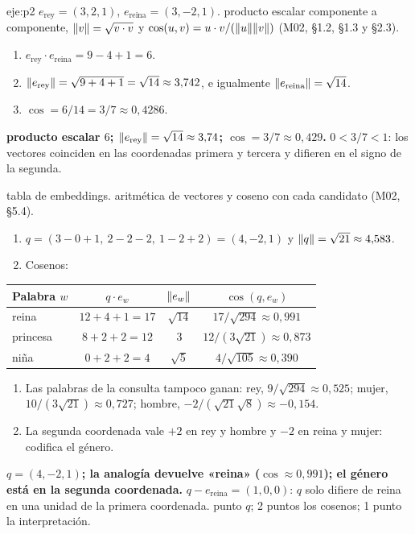 \begin{solucion}{eje:p2}
\datos $e_{\text{rey}}=(3,2,1)$, $e_{\text{reina}}=(3,-2,1)$.
\planteamiento producto escalar componente a componente, $\lVert v\rVert=\sqrt{v\cdot v}$ y $\cos(u,v)=u\cdot v/(\lVert u\rVert\lVert v\rVert)$ (M02, §1.2, §1.3 y §2.3).
\pasos
\begin{enumerate}[label=\arabic*.]
  \item $e_{\text{rey}}\cdot e_{\text{reina}}=9-4+1=6$.
  \item $\lVert e_{\text{rey}}\rVert=\sqrt{9+4+1}=\sqrt{14}\approx 3{,}742$, e igualmente $\lVert e_{\text{reina}}\rVert=\sqrt{14}$.
  \item $\cos=6/14=3/7\approx 0{,}4286$.
\end{enumerate}
\resultado \textbf{producto escalar $6$; $\lVert e_{\text{rey}}\rVert=\sqrt{14}\approx 3{,}74$; $\cos=3/7\approx 0{,}429$.}
\comprobacion $0<3/7<1$: los vectores coinciden en las coordenadas primera y tercera y difieren en el signo de la segunda.

\datos tabla de embeddings.
\planteamiento aritmética de vectores y coseno con cada candidato (M02, §5.4).
\pasos
\begin{enumerate}[label=\arabic*.]
  \item $q=(3-0+1,\ 2-2-2,\ 1-2+2)=(4,-2,1)$ y $\lVert q\rVert=\sqrt{21}\approx 4{,}583$.
  \item Cosenos:
\end{enumerate}
\begin{center}
\small
\begin{tabular}{@{}lccc@{}}
\toprule
Palabra $w$ & $q\cdot e_w$ & $\lVert e_w\rVert$ & $\cos(q,e_w)$ \\
\midrule
reina & $12+4+1=17$ & $\sqrt{14}$ & $17/\sqrt{294}\approx 0{,}991$ \\
princesa & $8+2+2=12$ & $3$ & $12/(3\sqrt{21})\approx 0{,}873$ \\
niña & $0+2+2=4$ & $\sqrt5$ & $4/\sqrt{105}\approx 0{,}390$ \\
\bottomrule
\end{tabular}
\end{center}
\begin{enumerate}[label=\arabic*.,start=3]
  \item Las palabras de la consulta tampoco ganan: rey, $9/\sqrt{294}\approx 0{,}525$; mujer, $10/(3\sqrt{21})\approx 0{,}727$; hombre, $-2/(\sqrt{21}\sqrt8)\approx -0{,}154$.
  \item La segunda coordenada vale $+2$ en rey y hombre y $-2$ en reina y mujer: codifica el género.
\end{enumerate}
\resultado \textbf{$q=(4,-2,1)$; la analogía devuelve «reina» ($\cos\approx 0{,}991$); el género está en la segunda coordenada.}
\comprobacion $q-e_{\text{reina}}=(1,0,0)$: $q$ solo difiere de reina en una unidad de la primera coordenada.
 punto $q$; 2 puntos los cosenos; 1 punto la interpretación.


\end{solucion}
